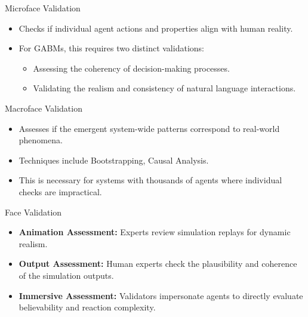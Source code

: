 \documentclass[24pt]{beamer}
\begin{document}
\begin{frame}{Microface Validation}
	\begin{itemize}
		\item Checks if individual agent actions and properties align with human reality.
		\item For GABMs, this requires two distinct validations:
		\begin{itemize}
			\item Assessing the coherency of decision-making processes.
			\item Validating the realism and consistency of natural language interactions.
		\end{itemize}
	\end{itemize}
\end{frame}

\begin{frame}{Macroface Validation}
	\begin{itemize}
		\item Assesses if the emergent system-wide patterns correspond to real-world phenomena.
		\item Techniques include Bootstrapping, Causal Analysis.
		\item This is necessary for systems with thousands of agents where individual checks are impractical.
	\end{itemize}
\end{frame}

\begin{frame}{Face Validation}
	\begin{itemize}
		\item \textbf{Animation Assessment:} Experts review simulation replays for dynamic realism.
		\item \textbf{Output Assessment:} Human experts check the plausibility and coherence of the simulation outputs.
		\item \textbf{Immersive Assessment:} Validators impersonate agents to directly evaluate believability and reaction complexity.
	\end{itemize}
\end{frame}
\end{document}
